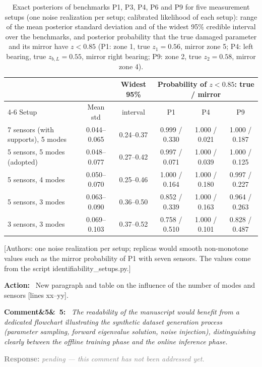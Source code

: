 \documentclass[11pt]{article}
\newenvironment{rcomment}[1]{\par\bigskip\noindent\textbf{Comment\ifx&#1&\else\ #1\fi:}\ \itshape}{\par}
\newenvironment{action}{\par\smallskip\noindent\color{resp}\textbf{Action:}\ }{\par}
\newcommand{\pending}{\par\smallskip\noindent\textcolor{gray}{\textbf{Response:} \textit{pending --- this comment
has not been addressed yet.}}\par}
\newcommand{\authornote}[1]{\textcolor{note}{\textsf{[Authors: #1]}}}
\newcommand{\tbd}[1]{\textcolor{note}{\textsf{[#1]}}}
\newcommand{\lines}[1]{\tbd{lines #1}}
\begin{document}
\begin{table}[H]
\centering\small
\caption{Exact posteriors of benchmarks P1, P3, P4, P6 and P9 for five measurement setups (one noise realization per
setup; calibrated likelihood of each setup): range of the mean posterior standard deviation and of the widest 95\%
credible interval over the benchmarks, and posterior probability that the true damaged parameter and its mirror have
$z<0.85$ (P1: zone 1, true $z_1=0.56$, mirror zone 5; P4: left bearing, true $z_{b,L}=0.55$, mirror right bearing; P9:
zone 2, true $z_2=0.58$, mirror zone 4).}
\label{tab:modes}
\footnotesize\setlength{\tabcolsep}{4pt}
\begin{tabular}{lccccc}
\toprule
 & & Widest 95\% & \multicolumn{3}{c}{Probability of $z<0.85$: true / mirror} \\
\cmidrule(l){4-6}
Setup & Mean std & interval & P1 & P4 & P9 \\
\midrule
7 sensors (with supports), 5 modes & 0.044--0.065 & 0.24--0.37 & 0.999 / 0.330 & 1.000 / 0.021 & 1.000 / 0.187 \\
5 sensors, 5 modes (adopted) & 0.048--0.077 & 0.27--0.42 & 0.997 / 0.071 & 1.000 / 0.039 & 1.000 / 0.125 \\
5 sensors, 4 modes & 0.050--0.070 & 0.25--0.46 & 1.000 / 0.164 & 1.000 / 0.180 & 0.997 / 0.227 \\
5 sensors, 3 modes & 0.063--0.090 & 0.36--0.50 & 0.852 / 0.339 & 1.000 / 0.163 & 0.964 / 0.263 \\
3 sensors, 3 modes & 0.069--0.103 & 0.37--0.52 & 0.758 / 0.510 & 1.000 / 0.101 & 0.828 / 0.487 \\
\bottomrule
\end{tabular}
\end{table}
\authornote{one noise realization per setup; replicas would smooth non-monotone values such as the mirror probability of
P1 with seven sensors. The values come from the script identifiability\_setups.py.}

\begin{action}
New paragraph and table on the influence of the number of modes and sensors \lines{xx--yy}.
\end{action}

\begin{rcomment}{5}
The readability of the manuscript would benefit from a dedicated flowchart illustrating the synthetic dataset
generation process (parameter sampling, forward eigenvalue solution, noise injection), distinguishing clearly between
the offline training phase and the online inference phase.
\end{rcomment}
\pending
\end{document}
